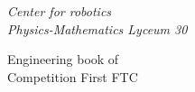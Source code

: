 \thispagestyle{titlestyle}
\begin{titlepage}
	
	\begin{center}
		\LARGE\textit{Center for robotics \\ Physics-Mathematics Lyceum 30}
		\begin{figure}[H]
		\end{figure}
		\vspace{3em}
		
		\LARGE{Engineering book of \\ Competition First FTC}
		

\end{center}
\end{titlepage}
